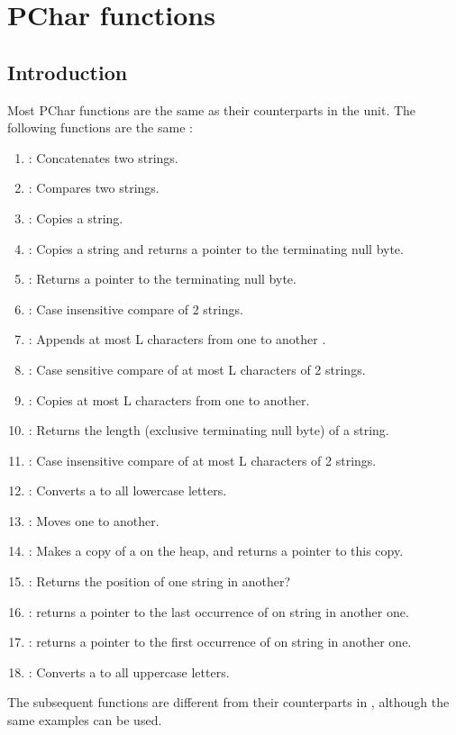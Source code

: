

\section{PChar functions}

\subsection{Introduction}

Most PChar functions are the same as their counterparts in the 
unit. The following functions are the same :

\begin{enumerate}
\item {} : Concatenates two  strings.
\item {} : Compares two  strings.
\item {} : Copies a  string.
\item {} : Copies a  string and returns a pointer to
the terminating null byte.
\item {} : Returns a pointer to the terminating null byte.
\item {} : Case insensitive compare of 2  strings.
\item {} : Appends at most L characters from one  to
another .
\item {} : Case sensitive compare of at most L characters of 2
  strings.
\item {} : Copies at most L characters from one  to
another.
\item {} : Returns the length (exclusive terminating null byte)
of a  string.
\item {} : Case insensitive compare of at most L characters of 2
  strings.
\item {} : Converts a  to all lowercase letters.
\item {} : Moves one  to another.
\item {} : Makes a copy of a  on the heap, and returns
a pointer to this copy.
\item {} : Returns the position of one  string in
another?
\item {} : returns a pointer to the last occurrence of on
  string in another one.
\item {} : returns a pointer to the first occurrence of on
  string in another one.
\item {} : Converts a  to all uppercase letters.
\end{enumerate}
The subsequent functions are different from their counterparts in
, although the same examples can be used.


